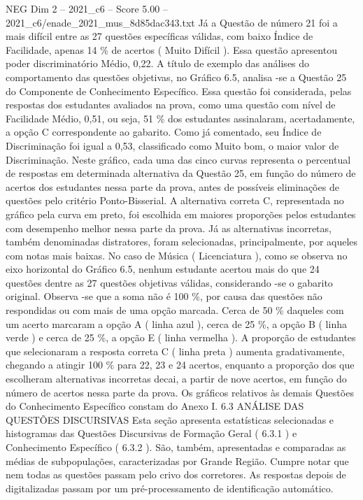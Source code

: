 \begin{textsample}{NEG Dim 2 – 2021\_c6 – Score 5.00 – 2021\_c6/enade\_2021\_mus\_8d85dac343.txt}
Já a Questão de número 21 foi a mais difícil entre as 27 questões específicas válidas, com baixo Índice de Facilidade, apenas 14 \% de acertos ( Muito Difícil ).
Essa questão apresentou poder discriminatório Médio, 0,22.
A título de exemplo das análises do comportamento das questões objetivas, no Gráfico 6.5, analisa -se a Questão 25 do Componente de Conhecimento Específico.
Essa questão foi considerada, pelas respostas dos estudantes avaliados na prova, como uma questão com nível de Facilidade Médio, 0,51, ou seja, 51 \% dos estudantes assinalaram, acertadamente, a opção C correspondente ao gabarito.
Como já comentado, seu Índice de Discriminação foi igual a 0,53, classificado como Muito bom, o maior valor de Discriminação.
Neste gráfico, cada uma das cinco curvas representa o percentual de respostas em determinada alternativa da Questão 25, em função do número de acertos dos estudantes nessa parte da prova, antes de possíveis eliminações de questões pelo critério Ponto-Bisserial.
A alternativa correta C, representada no gráfico pela curva em preto, foi escolhida em maiores proporções pelos estudantes com desempenho melhor nessa parte da prova.
Já as alternativas incorretas, também denominadas distratores, foram selecionadas, principalmente, por aqueles com notas mais baixas.
No caso de Música ( Licenciatura ), como se observa no eixo horizontal do Gráfico 6.5, nenhum estudante acertou mais do que 24 questões dentre as 27 questões objetivas válidas, considerando -se o gabarito original.
Observa -se que a soma não é 100 \%, por causa das questões não respondidas ou com mais de uma opção marcada.
Cerca de 50 \% daqueles com um acerto marcaram a opção A ( linha azul ), cerca de 25 \%, a opção B ( linha verde ) e cerca de 25 \%, a opção E ( linha vermelha ).
A proporção de estudantes que selecionaram a resposta correta C ( linha preta ) aumenta gradativamente, chegando a atingir 100 \% para 22, 23 e 24 acertos, enquanto a proporção dos que escolheram alternativas incorretas decai, a partir de nove acertos, em função do número de acertos nessa parte da prova.
Os gráficos relativos às demais Questões do Conhecimento Específico constam do Anexo I. 6.3 ANÁLISE DAS QUESTÕES DISCURSIVAS Esta seção apresenta estatísticas selecionadas e histogramas das Questões Discursivas de Formação Geral ( 6.3.1 ) e Conhecimento Específico ( 6.3.2 ).
São, também, apresentadas e comparadas as médias de subpopulações, caracterizadas por Grande Região.
Cumpre notar que nem todas as questões passam pelo crivo dos corretores.
As respostas depois de digitalizadas passam por um pré-processamento de identificação automático.

\end{textsample}
